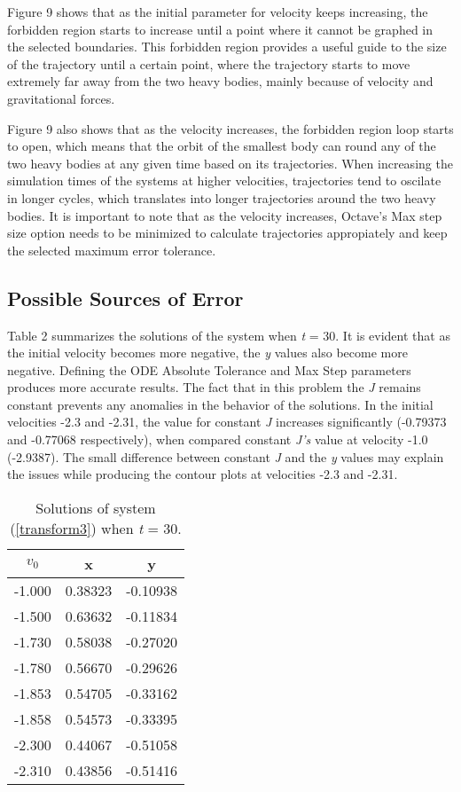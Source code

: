 \documentclass{article}
\begin{document}
Figure 9 shows that as the initial parameter for velocity keeps increasing, the forbidden region starts to increase until a point where it cannot be graphed in the selected boundaries. This forbidden region provides a useful guide to the size of the trajectory until a certain point, where the trajectory starts to move extremely far away from the two heavy bodies, mainly because of velocity and gravitational forces. 

Figure 9 also shows that as the velocity increases, the forbidden region loop starts to open, which means that the orbit of the smallest body can round any of the two heavy bodies at any given time based on its trajectories. When increasing the simulation times of the systems at higher velocities, trajectories tend to oscilate in longer cycles, which translates into longer trajectories around the two heavy bodies. It is important to note that as the velocity increases, Octave's Max step size option needs to be minimized to calculate trajectories appropiately and keep the selected maximum error tolerance.


\subsection{Possible Sources of Error}

Table 2 summarizes the solutions of the system when \textit{t} = 30. It is evident that as the initial velocity becomes more negative, the \textit{y} values also become more negative. Defining the ODE Absolute Tolerance and Max Step parameters produces more accurate results. The fact that in this problem the \textit{J} remains constant prevents any anomalies in the behavior of the solutions. In the initial velocities -2.3 and -2.31, the value for constant \textit{J} increases significantly (-0.79373 and -0.77068 respectively), when compared constant \textit{J’s} value at velocity -1.0 (-2.9387). The small difference between constant \textit{J} and the \textit{y} values may explain the issues while producing the contour plots at velocities -2.3 and -2.31.

\begin{table}[h!]
  \begin{center}
    \caption{Solutions of system (\ref{transform3}) when \textit{t} = 30.}
    \label{tab:table1}
    \begin{tabular}{c|c|c} 
      \textbf{$v_0$} & \textbf{x} & \textbf{y}\\
      \hline
      -1.000 & 0.38323 & -0.10938 \\
      -1.500 & 0.63632 & -0.11834 \\
      -1.730 & 0.58038 & -0.27020 \\
      -1.780 & 0.56670 & -0.29626 \\
      -1.853 & 0.54705 & -0.33162 \\
      -1.858 & 0.54573 & -0.33395 \\
      -2.300 & 0.44067 & -0.51058 \\
      -2.310 & 0.43856 & -0.51416 \\
      \hline
    \end{tabular}
  \end{center}
\end{table}
\end{document}
